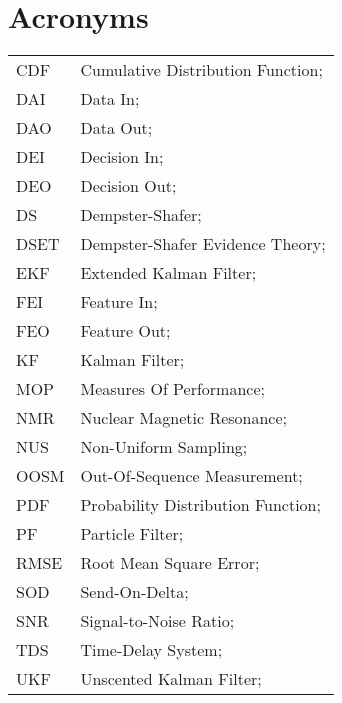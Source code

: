 \section*{Acronyms}
\begin{tabular}{ll}
	CDF			& Cumulative Distribution Function; \\
	DAI			& Data In; \\
	DAO			& Data Out; \\
	DEI			& Decision In; \\
	DEO 		& Decision Out; \\
	DS			& Dempster-Shafer; \\
	DSET 		& Dempster-Shafer Evidence Theory; \\		
	EKF			& Extended Kalman Filter; \\
	FEI			& Feature In; \\
	FEO			& Feature Out; \\
	KF 			& Kalman Filter; \\
	MOP 		& Measures Of Performance; \\
	NMR 		& Nuclear Magnetic Resonance; \\
	NUS 		& Non-Uniform Sampling; \\ 
	OOSM 		& Out-Of-Sequence Measurement; \\
	PDF         & Probability Distribution Function; \\
	PF 			& Particle Filter; \\
	RMSE		& Root Mean Square Error; \\
	SOD			& Send-On-Delta; \\
	SNR			& Signal-to-Noise Ratio; \\
	TDS			& Time-Delay System; \\
	UKF			& Unscented Kalman Filter; \\
\end{tabular}

